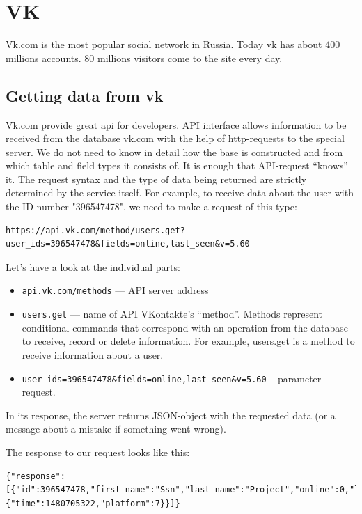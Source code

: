 \section{VK}
Vk.com is the most popular social network in Russia. Today vk has about 400 millions accounts. 80 millions visitors come to the site every day. 
\subsection{Getting data from vk}
Vk.com provide great api for developers. API interface allows information to be received from the database vk.com with the help of http-requests to the special server. We do not need to know in detail how the base is constructed and from which table and field types it consists of. It is enough that API-request “knows” it. The request syntax and the type of data being returned are strictly determined by the service itself. 
For example, to receive data about the user with the ID number "396547478", we need to make a request of this type:


\begin{lstlisting}
https://api.vk.com/method/users.get?user_ids=396547478&fields=online,last_seen&v=5.60
\end{lstlisting}

Let’s have a look at the individual parts:
\begin{itemize}
	\item{\texttt{api.vk.com/methods} — API server address}
	\item{\texttt{users.get} — name of API VKontakte’s “method”. Methods represent conditional commands that correspond with an operation from the database to receive, record or delete information. For example, users.get is a method to receive information about a user.}
	\item{\texttt{user{\_}ids=396547478{\&}fields=online,last{\_}seen{\&}v=5.60}  – parameter request.}
\end{itemize}
	
In its response, the server returns JSON-object with the requested data (or a message about a mistake if something went wrong). 

The response to our request looks like this:
\begin{lstlisting}
{"response":[{"id":396547478,"first_name":"Ssn","last_name":"Project","online":0,"last_seen":{"time":1480705322,"platform":7}}]}
\end{lstlisting}

